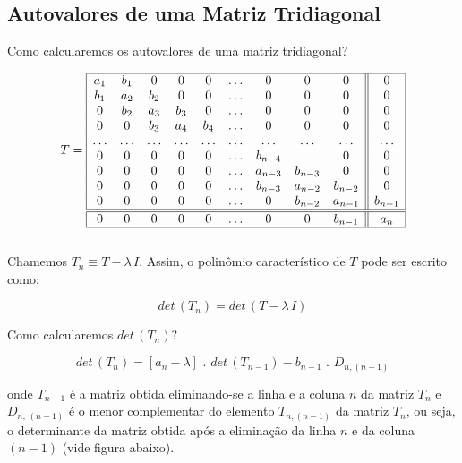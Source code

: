 \subsection{Autovalores de uma Matriz Tridiagonal}

Como calcularemos os autovalores de uma matriz tridiagonal?

\[
 T =
 \begin{array}{|ccccccccc||c|}
  \hline
  a_1 & b_1 & 0 & 0 & 0 & \ldots & 0 & 0 & 0 & 0\\
  b_1 & a_2 & b_2 & 0 & 0 & \ldots & 0 & 0 & 0 & 0\\
  0   & b_2 & a_3 & b_3 & 0 & \ldots & 0 & 0 & 0 & 0\\
  0   & 0 & b_3 & a_4 & b_4 & \ldots & 0 & 0 & 0 & 0\\
  \ldots & \ldots & \ldots & \ldots & \ldots & \ldots & \ldots & \ldots & \ldots & \ldots\\
  0 & 0 & 0 & 0 & 0 & \ldots & b_{n-4} & & 0 & 0\\
  0 & 0 & 0 & 0 & 0 & \ldots & a_{n-3} & b_{n-3} & 0 & 0\\
  0 & 0 & 0 & 0 & 0 & \ldots & b_{n-3} & a_{n-2} & b_{n-2} & 0\\
  0 & 0 & 0 & 0 & 0 & \ldots & 0 & b_{n-2} & a_{n-1} & b_{n-1}\\
  \hline
  \hline
  0 & 0 & 0 & 0 & 0 & \ldots & 0 & 0 & b_{n-1} & a_n\\
  \hline
 \end{array}
\]\\

Chamemos $ T_n \equiv T - \lambda \, I $. Assim, o polinômio característico de $ T $ pode ser escrito como:

\begin{equation}
\label{cap5:sec3:eq25}
det \, (T_n) = det \, (T - \lambda \, I)
\end{equation}

Como calcularemos $ det \, (T_n) $?

\begin{equation}
\label{cap5:sec3:eq26}
det \, (T_n) = [a_n - \lambda] \, \, . \, \, det \, (T_{n-1}) - b_{n-1} \, \, . \, \, D_{n,(n-1)}
\end{equation}

\noindent
onde $ T_{n-1} $ é a matriz obtida eliminando-se a linha e a coluna $ n $ da matriz $ T_n $ e $ D_{n, \, (n-1)} $ é o menor complementar do elemento $ T_{n, (n-1)} $ da matriz $ T_n $, ou seja, o determinante da matriz obtida após a eliminação da linha $ n $ e da coluna $ (n-1) $ (vide figura abaixo).

